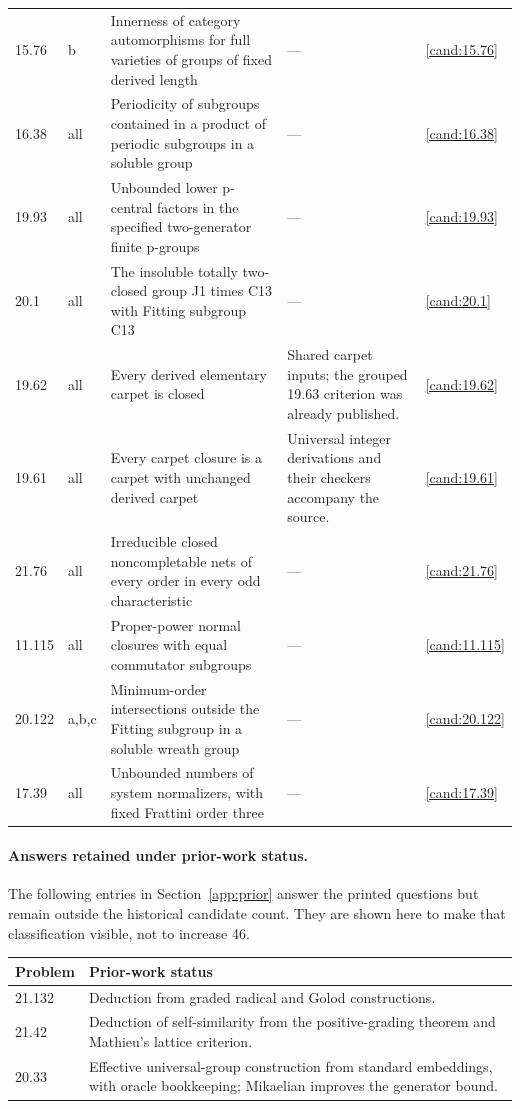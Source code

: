 \begin{longtable}{@{}p{}p{}>{\raggedright\arraybackslash}p{}>{\raggedright\arraybackslash}p{}p{}@{}}
15.76 & b & Innerness of category automorphisms for full varieties of groups of fixed derived length & --- & \ref{cand:15.76} \\
16.38 & all & Periodicity of subgroups contained in a product of periodic subgroups in a soluble group & --- & \ref{cand:16.38} \\
19.93 & all & Unbounded lower p-central factors in the specified two-generator finite p-groups & --- & \ref{cand:19.93} \\
20.1 & all & The insoluble totally two-closed group J1 times C13 with Fitting subgroup C13 & --- & \ref{cand:20.1} \\
19.62 & all & Every derived elementary carpet is closed & Shared carpet inputs; the grouped 19.63 criterion was already published. & \ref{cand:19.62} \\
19.61 & all & Every carpet closure is a carpet with unchanged derived carpet & Universal integer derivations and their checkers accompany the source. & \ref{cand:19.61} \\
21.76 & all & Irreducible closed noncompletable nets of every order in every odd characteristic & --- & \ref{cand:21.76} \\
11.115 & all & Proper-power normal closures with equal commutator subgroups & --- & \ref{cand:11.115} \\
20.122 & a,b,c & Minimum-order intersections outside the Fitting subgroup in a soluble wreath group & --- & \ref{cand:20.122} \\
17.39 & all & Unbounded numbers of system normalizers, with fixed Frattini order three & --- & \ref{cand:17.39} \\
\end{longtable}
\normalsize

\paragraph{Answers retained under prior-work status.}
The following entries in Section~\ref{app:prior} answer the printed
questions but remain outside the historical candidate count. They are
shown here to make that classification visible, not to increase 46.
\begin{center}\small
\begin{tabular}{@{}lp{}@{}}\toprule
Problem & Prior-work status\\\midrule
21.132 & Deduction from graded radical and Golod constructions.\\
21.42 & Deduction of self-similarity from the positive-grading theorem and Mathieu's lattice criterion.\\
20.33 & Effective universal-group construction from standard embeddings, with oracle bookkeeping; Mikaelian improves the generator bound.\\
\bottomrule\end{tabular}\end{center}
